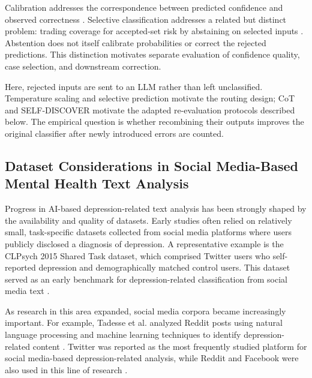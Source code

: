 \documentclass{ieeeaccess}
\begin{document}
Calibration addresses the correspondence between predicted confidence and observed correctness \cite{ref15}. Selective classification addresses a related but distinct problem: trading coverage for accepted-set risk by abstaining on selected inputs \cite{ref16}. Abstention does not itself calibrate probabilities or correct the rejected predictions. This distinction motivates separate evaluation of confidence quality, case selection, and downstream correction.

Here, rejected inputs are sent to an LLM rather than left unclassified. Temperature scaling \cite{ref15} and selective prediction \cite{ref16} motivate the routing design; CoT \cite{ref17} and SELF-DISCOVER \cite{ref18} motivate the adapted re-evaluation protocols described below. The empirical question is whether recombining their outputs improves the original classifier after newly introduced errors are counted.

\subsection{Dataset Considerations in Social Media-Based Mental Health Text Analysis}

Progress in AI-based depression-related text analysis has been strongly shaped by the availability and quality of datasets. Early studies often relied on relatively small, task-specific datasets collected from social media platforms where users publicly disclosed a diagnosis of depression. A representative example is the CLPsych 2015 Shared Task dataset, which comprised Twitter users who self-reported depression and demographically matched control users. This dataset served as an early benchmark for depression-related classification from social media text \cite{ref23}.

As research in this area expanded, social media corpora became increasingly important. For example, Tadesse et al. analyzed Reddit posts using natural language processing and machine learning techniques to identify depression-related content \cite{ref31}. Twitter was reported as the most frequently studied platform for social media-based depression-related analysis, while Reddit and Facebook were also used in this line of research \cite{ref36}.
\end{document}
